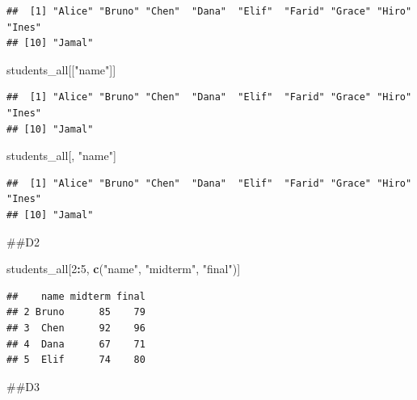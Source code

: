 \documentclass[
]{article}
\newenvironment{Shaded}{\begin{snugshade}}{\end{snugshade}}
\newcommand{\DecValTok}[1]{\textcolor[rgb]{0.00,0.00,0.81}{#1}}
\newcommand{\FunctionTok}[1]{\textcolor[rgb]{0.13,0.29,0.53}{\textbf{#1}}}
\newcommand{\NormalTok}[1]{#1}
\newcommand{\SpecialCharTok}[1]{\textcolor[rgb]{0.81,0.36,0.00}{\textbf{#1}}}
\newcommand{\StringTok}[1]{\textcolor[rgb]{0.31,0.60,0.02}{#1}}
\begin{document}
\begin{verbatim}
##  [1] "Alice" "Bruno" "Chen"  "Dana"  "Elif"  "Farid" "Grace" "Hiro"  "Ines" 
## [10] "Jamal"
\end{verbatim}

\begin{Shaded}
\begin{Highlighting}[]
\NormalTok{students\_all[[}\StringTok{"name"}\NormalTok{]]}
\end{Highlighting}
\end{Shaded}

\begin{verbatim}
##  [1] "Alice" "Bruno" "Chen"  "Dana"  "Elif"  "Farid" "Grace" "Hiro"  "Ines" 
## [10] "Jamal"
\end{verbatim}

\begin{Shaded}
\begin{Highlighting}[]
\NormalTok{students\_all[, }\StringTok{"name"}\NormalTok{]}
\end{Highlighting}
\end{Shaded}

\begin{verbatim}
##  [1] "Alice" "Bruno" "Chen"  "Dana"  "Elif"  "Farid" "Grace" "Hiro"  "Ines" 
## [10] "Jamal"
\end{verbatim}

\#\#D2

\begin{Shaded}
\begin{Highlighting}[]
\NormalTok{students\_all[}\DecValTok{2}\SpecialCharTok{:}\DecValTok{5}\NormalTok{, }\FunctionTok{c}\NormalTok{(}\StringTok{"name"}\NormalTok{, }\StringTok{"midterm"}\NormalTok{, }\StringTok{"final"}\NormalTok{)]}
\end{Highlighting}
\end{Shaded}

\begin{verbatim}
##    name midterm final
## 2 Bruno      85    79
## 3  Chen      92    96
## 4  Dana      67    71
## 5  Elif      74    80
\end{verbatim}

\#\#D3

\begin{Shaded}
\end{Shaded}
\end{document}
